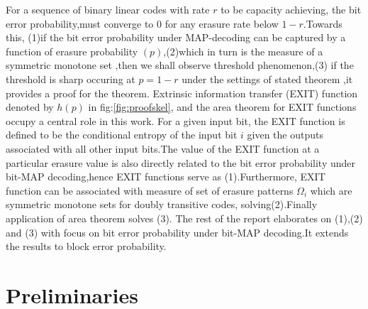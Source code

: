 \documentclass[
10pt, %
a4paper, %
oneside, %
headinclude,footinclude, %
BCOR5mm, %
]{scrartcl}
\begin{document}
For a sequence of binary linear codes with rate $r$ to be capacity achieving, the bit error probability,must converge to $0$ for any erasure rate below $1-r$.Towards this, (1)if the bit error probability under MAP-decoding can be captured by a function of erasure probability $(p)$,(2)which in turn is the measure of a symmetric monotone set ,then we shall observe threshold phenomenon,(3) if the threshold is sharp occuring at $p=1-r$ under the settings of stated theorem ,it provides a proof for the theorem.
Extrinsic information transfer (EXIT) function~\cite{exit} denoted by $h(p)$ in fig:\ref{fig:proofskel}, and the area theorem for EXIT functions~\cite{areathm} occupy a central role in this work. For a given input bit, the EXIT function is defined to be the conditional entropy of the input bit $i$ given the outputs associated with all other input bits.The value of the EXIT function at a particular erasure value is also directly related to the bit error probability under bit-MAP decoding,hence EXIT functions serve as (1).Furthermore, EXIT function can be associated with measure of set of erasure patterns $\Omega_i$ which are symmetric monotone sets for doubly transitive codes, solving(2).Finally application of area theorem solves (3).
The rest of the report elaborates on (1),(2) and (3) with focus on bit error probability under bit-MAP decoding.It extends the results to block error probability.


\section{Preliminaries}
\end{document}
